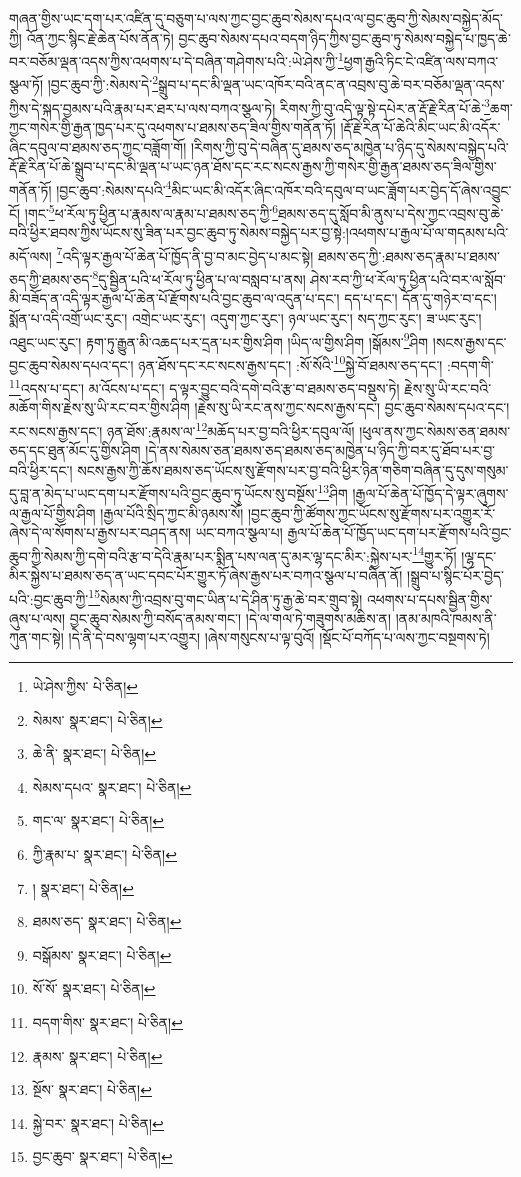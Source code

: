 གཞན་གྱིས་ཡང་དག་པར་འཛིན་དུ་བཅུག་པ་ལས་ཀྱང་བྱང་ཆུབ་སེམས་དཔའ་ལ་བྱང་ཆུབ་ཀྱི་སེམས་བསྐྱེད་མོད་ཀྱི། འོན་ཀྱང་སྙིང་རྗེ་ཆེན་པོས་ནོན་ཏེ། བྱང་ཆུབ་སེམས་དཔའ་བདག་ཉིད་ཀྱིས་བྱང་ཆུབ་ཏུ་སེམས་བསྐྱེད་པ་ཁྱད་ཆེ་བར་བཅོམ་ལྡན་འདས་ཀྱིས་འཕགས་པ་དེ་བཞིན་གཤེགས་པའི་:ཡེ་ཤེས་ཀྱི་\footnote{ཡེ་ཤེས་ཀྱིས་  པེ་ཅིན། }ཕྱག་རྒྱའི་ཏིང་ངེ་འཛིན་ལས་བཀའ་སྩལ་ཏོ། །བྱང་ཆུབ་ཀྱི་:སེམས་དེ་\footnote{སེམས་  སྣར་ཐང་།  པེ་ཅིན། }སྒྲུབ་པ་དང་མི་ལྡན་ཡང་འཁོར་བའི་ནང་ན་འབྲས་བུ་ཆེ་བར་བཅོམ་ལྡན་འདས་ཀྱིས་དེ་སྐད་བྱམས་པའི་རྣམ་པར་ཐར་པ་ལས་བཀའ་སྩལ་ཏེ། རིགས་ཀྱི་བུ་འདི་ལྟ་སྟེ་དཔེར་ན་རྡོ་རྗེ་རིན་པོ་ཆེ་\footnote{ཆེ་ནི་  སྣར་ཐང་།  པེ་ཅིན། }ཆག་ཀྱང་གསེར་གྱི་རྒྱན་ཁྱད་པར་དུ་འཕགས་པ་ཐམས་ཅད་ཟིལ་གྱིས་གནོན་ཏོ། །རྡོ་རྗེ་རིན་པོ་ཆེའི་མིང་ཡང་མི་འདོར་ཞིང་དབུལ་བ་ཐམས་ཅད་ཀྱང་བཟློག་གོ། །རིགས་ཀྱི་བུ་དེ་བཞིན་དུ་ཐམས་ཅད་མཁྱེན་པ་ཉིད་དུ་སེམས་བསྐྱེད་པའི་རྡོ་རྗེ་རིན་པོ་ཆེ་སྒྲུབ་པ་དང་མི་ལྡན་པ་ཡང་ཉན་ཐོས་དང་རང་སངས་རྒྱས་ཀྱི་གསེར་གྱི་རྒྱན་ཐམས་ཅད་ཟིལ་གྱིས་གནོན་ཏོ། །བྱང་ཆུབ་:སེམས་དཔའི་\footnote{སེམས་དཔའ་  སྣར་ཐང་།  པེ་ཅིན། }མིང་ཡང་མི་འདོར་ཞིང་འཁོར་བའི་དབུལ་བ་ཡང་ཟློག་པར་བྱེད་དོ་ཞེས་འབྱུང་ངོ། །གང་\footnote{གང་ལ་  སྣར་ཐང་།  པེ་ཅིན། }ཕ་རོལ་ཏུ་ཕྱིན་པ་རྣམས་ལ་རྣམ་པ་ཐམས་ཅད་ཀྱི་\footnote{ཀྱི་རྣམ་པ་  སྣར་ཐང་།  པེ་ཅིན། }ཐམས་ཅད་དུ་སློབ་མི་ནུས་པ་དེས་ཀྱང་འབྲས་བུ་ཆེ་བའི་ཕྱིར་ཐབས་ཀྱིས་ཡོངས་སུ་ཟིན་པར་བྱང་ཆུབ་ཏུ་སེམས་བསྐྱེད་པར་བྱ་སྟེ:།འཕགས་པ་རྒྱལ་པོ་ལ་གདམས་པའི་མདོ་ལས། \footnote{།   སྣར་ཐང་།  པེ་ཅིན། }འདི་ལྟར་རྒྱལ་པོ་ཆེན་པོ་ཁྱོད་ནི་བྱ་བ་མང་བྱེད་པ་མང་སྟེ། ཐམས་ཅད་ཀྱི་:ཐམས་ཅད་རྣམ་པ་ཐམས་ཅད་ཀྱི་ཐམས་ཅད་\footnote{ཐམས་ཅད་  སྣར་ཐང་།  པེ་ཅིན། }དུ་སྦྱིན་པའི་ཕ་རོལ་ཏུ་ཕྱིན་པ་ལ་བསླབ་པ་ནས། ཤེས་རབ་ཀྱི་ཕ་རོལ་ཏུ་ཕྱིན་པའི་བར་ལ་སློབ་མི་བཟོད་ན་འདི་ལྟར་རྒྱལ་པོ་ཆེན་པོ་རྫོགས་པའི་བྱང་ཆུབ་ལ་འདུན་པ་དང་། དད་པ་དང་། དོན་དུ་གཉེར་བ་དང་། སྨོན་པ་འདི་འགྲོ་ཡང་རུང་། འགྲེང་ཡང་རུང་། འདུག་ཀྱང་རུང་། ཉལ་ཡང་རུང་། སད་ཀྱང་རུང་། ཟ་ཡང་རུང་། འཐུང་ཡང་རུང་། རྟག་ཏུ་རྒྱུན་མི་འཆད་པར་དྲན་པར་གྱིས་ཤིག །ཡིད་ལ་གྱིས་ཤིག །སྒོམས་\footnote{བསྒོམས་  སྣར་ཐང་།  པེ་ཅིན། }ཤིག །སངས་རྒྱས་དང་བྱང་ཆུབ་སེམས་དཔའ་དང་། ཉན་ཐོས་དང་རང་སངས་རྒྱས་དང་། :སོ་སོའི་\footnote{སོ་སོ་  སྣར་ཐང་།  པེ་ཅིན། }སྐྱེ་བོ་ཐམས་ཅད་དང་། :བདག་གི་\footnote{བདག་གིས་  སྣར་ཐང་།  པེ་ཅིན། }འདས་པ་དང་། མ་འོངས་པ་དང་། ད་ལྟར་བྱུང་བའི་དགེ་བའི་རྩ་བ་ཐམས་ཅད་བསྡུས་ཏེ། རྗེས་སུ་ཡི་རང་བའི་མཆོག་གིས་རྗེས་སུ་ཡི་རང་བར་གྱིས་ཤིག །རྗེས་སུ་ཡི་རང་ནས་ཀྱང་སངས་རྒྱས་དང་། བྱང་ཆུབ་སེམས་དཔའ་དང་། རང་སངས་རྒྱས་དང་། ཉན་ཐོས་:རྣམས་ལ་\footnote{རྣམས་  སྣར་ཐང་།  པེ་ཅིན། }མཆོད་པར་བྱ་བའི་ཕྱིར་དབུལ་ལོ། །ཕུལ་ནས་ཀྱང་སེམས་ཅན་ཐམས་ཅད་དང་ཐུན་མོང་དུ་གྱིས་ཤིག །དེ་ནས་སེམས་ཅན་ཐམས་ཅད་ཐམས་ཅད་མཁྱེན་པ་ཉིད་ཀྱི་བར་དུ་ཐོབ་པར་བྱ་བའི་ཕྱིར་དང་། སངས་རྒྱས་ཀྱི་ཆོས་ཐམས་ཅད་ཡོངས་སུ་རྫོགས་པར་བྱ་བའི་ཕྱིར་ཉིན་གཅིག་བཞིན་དུ་དུས་གསུམ་དུ་བླ་ན་མེད་པ་ཡང་དག་པར་རྫོགས་པའི་བྱང་ཆུབ་ཏུ་ཡོངས་སུ་བསྔོས་\footnote{སྔོས་  སྣར་ཐང་།  པེ་ཅིན། }ཤིག །རྒྱལ་པོ་ཆེན་པོ་ཁྱོད་དེ་ལྟར་ཞུགས་ལ་རྒྱལ་པོ་གྱིས་ཤིག །རྒྱལ་པོའི་སྲིད་ཀྱང་མི་ཉམས་སོ། །བྱང་ཆུབ་ཀྱི་ཚོགས་ཀྱང་ཡོངས་སུ་རྫོགས་པར་འགྱུར་རོ་ཞེས་དེ་ལ་སོགས་པ་རྒྱས་པར་བཤད་ནས། ཡང་བཀའ་སྩལ་པ། རྒྱལ་པོ་ཆེན་པོ་ཁྱོད་ཡང་དག་པར་རྫོགས་པའི་བྱང་ཆུབ་ཀྱི་སེམས་ཀྱི་དགེ་བའི་རྩ་བ་དེའི་རྣམ་པར་སྨིན་པས་ལན་དུ་མར་ལྷ་དང་མིར་:སྐྱེས་པར་\footnote{སྐྱེ་བར་  སྣར་ཐང་།  པེ་ཅིན། }གྱུར་ཏོ། །ལྷ་དང་མིར་སྐྱེས་པ་ཐམས་ཅད་ན་ཡང་དབང་པོར་གྱུར་ཏོ་ཞེས་རྒྱས་པར་བཀའ་སྩལ་པ་བཞིན་ནོ། །སྒྲུབ་པ་སྙིང་པོར་བྱེད་པའི་:བྱང་ཆུབ་ཀྱི་\footnote{བྱང་ཆུབ་  སྣར་ཐང་།  པེ་ཅིན། }སེམས་ཀྱི་འབྲས་བུ་གང་ཡིན་པ་དེ་ཤིན་ཏུ་རྒྱ་ཆེ་བར་གྲུབ་སྟེ། འཕགས་པ་དཔས་སྦྱིན་གྱིས་ཞུས་པ་ལས། བྱང་ཆུབ་སེམས་ཀྱི་བསོད་ནམས་གང་། །དེ་ལ་གལ་ཏེ་གཟུགས་མཆིས་ན། །ནམ་མཁའི་ཁམས་ནི་ཀུན་གང་སྟེ། །དེ་ནི་དེ་བས་ལྷག་པར་འགྱུར། །ཞེས་གསུངས་པ་ལྟ་བུའོ། །སྡོང་པོ་བཀོད་པ་ལས་ཀྱང་བསྔགས་ཏེ། 